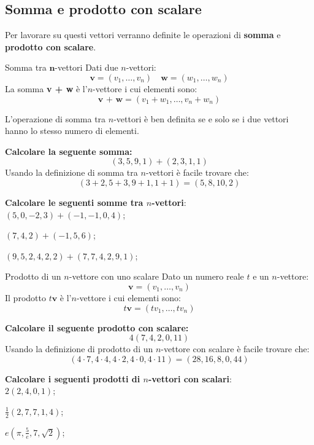 \subsection{Somma e prodotto con scalare}
Per lavorare su questi vettori verranno definite le operazioni di \textbf{somma} e \textbf{prodotto con scalare}.
\begin{newdef}{Somma tra $\bm{n}$-vettori}
    Dati due $n$-vettori:
    \[
        \textbf{v} = (v_1,\dots,v_n) \quad \textbf{w} = (w_1,\dots,w_n)
    \]
    La somma \textbf{v + w} è l'$n$-vettore i cui elementi sono:
    \[
        \textbf{v + w} = (v_1 + w_1, \dots, v_n + w_n)
    \]
\end{newdef}
\begin{nb}
    L'operazione di somma tra $n$-vettori è ben definita se e solo se i due vettori hanno lo stesso numero di elementi.
\end{nb}
\begin{esempio}
    \textbf{Calcolare la seguente somma:}
    \[
        (3, 5, 9, 1) + (2, 3, 1, 1)
    \]
    Usando la definizione di somma tra $n$-vettori è facile trovare che:
    \[
        (3 + 2, 5 + 3, 9 + 1, 1 + 1) = (5, 8, 10, 2)
    \]
\end{esempio}
\begin{exer}
    \textbf{Calcolare le seguenti somme tra $n$-vettori}:\\
    $(5,0,-2,3) + (-1, -1, 0, 4)$;

    $(7, 4, 2) + (-1, 5, 6)$;

    $(9, 5, 2, 4, 2, 2) + (7, 7, 4, 2, 9, 1)$;
\end{exer}
\begin{newdef}{Prodotto di un $n$-vettore con uno scalare}
    Dato un numero reale $t$ e un $n$-vettore:
    \[
        \textbf{v} = (v_1, \dots, v_n)
    \]
    Il prodotto $t\textbf{v}$ è l'$n$-vettore i cui elementi sono:
    \[
        t\textbf{v} = (tv_1, \dots, tv_n)
    \]
\end{newdef}
\begin{esempio}
    \textbf{Calcolare il seguente prodotto con scalare:}
    \[
        4(7, 4, 2, 0, 11)
    \]
    Usando la definizione di prodotto di un $n$-vettore con scalare è facile trovare che:
    \[
        (4 \cdot 7, 4 \cdot 4, 4 \cdot 2, 4 \cdot 0, 4 \cdot 11) = (28, 16, 8, 0, 44)
    \]
\end{esempio}
\begin{exer}
    \textbf{Calcolare i seguenti prodotti di $n$-vettori con scalari}:\\
    $2(2, 4, 0, 1)$;

    $\frac{1}{2}(2, 7, 7, 1, 4)$;

    $e(\pi, \frac{5}{e}, 7, \sqrt{2})$;
\end{exer}
